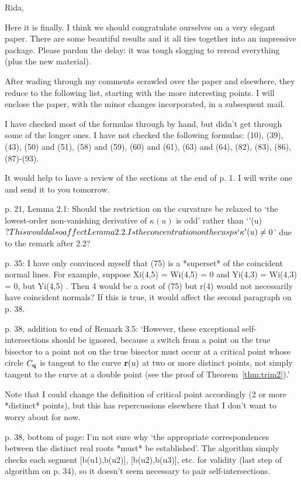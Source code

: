Rida, 

	Here it is finally.   I think we should congratulate ourselves on a 
very elegant paper.  There are some beautiful results and it all ties 
together into an impressive package.  Please pardon the delay: it was tough 
slogging to reread everything (plus the new material).

After wading through my comments scrawled over the paper and 
elsewhere, they reduce to the following list, starting with the more 
interesting points.  I will enclose the paper, with the minor changes 
incorporated, in a subsequent mail.

I have checked most of the formulas through by hand,
but didn't get through some of the longer ones.
I have not checked the following formulas: 
(10), (39), (43), (50) and (51), (58) and (59), (60) and (61), (63) and (64),
(82), (83), (86), (87)-(93).

It would help to have a review of the sections at the end of p. 1.
I will write one and send it to you tomorrow.



p. 21, Lemma 2.1: Should the restriction on the curvature be relaxed
	to `the lowest-order non-vanishing derivative of $\kappa(u)$ is odd'
	rather than `\kappa '(u) $?
	This would also affect Lemma 2.2.
	Is the concentration on the cusps `\kappa '(u) \neq 0$'
	due to the remark after 2.2?

p. 35: I have only convinced myself that (75) is a *superset* of the
	coincident normal lines.
	For example, suppose Xi(4,5) = Wi(4,5) = 0
	and Yi(4,3) = Wi(4,3) = 0, but Yi(4,5) .
	Then 4 would be a root of (75) but r(4) would not necessarily have
	coincident normals?
	If this is true, it would affect the second paragraph on p. 38.

p. 38, addition to end of Remark 3.5: 
	`However, these exceptional self-intersections should be ignored,
	because a switch from a point on the true bisector to a point not 
	on the true bisector must occur at a critical point whose circle 
	$C_{\bf q}$ is tangent to the curve ${\bf r}(u)$ at two or more 
	distinct points, not simply tangent to the curve at a double point 
	(see the proof of Theorem~\ref{thm:trim2}).'
	
	Note that I could change the definition of critical point
	accordingly (2 or more *distinct* points), 
	but this has repercussions elsewhere that
	I don't want to worry about for now.

p. 38, bottom of page: 
	I'm not sure why `the appropriate correspondences between the 
	distinct real roots *must* be established'.
	The algorithm simply checks each segment [b(u1),b(u2)],
	[b(u2),b(u3)], etc. for validity (last step of algorithm on p. 34),
	so it doesn't seem necessary to pair self-intersections.

